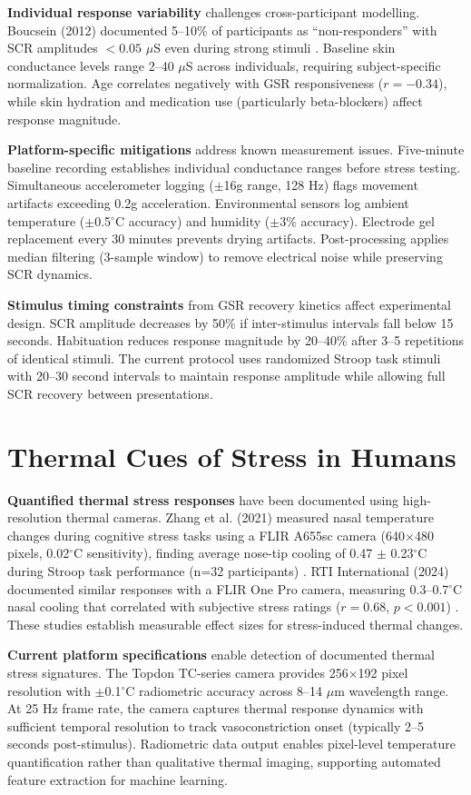 \textbf{Individual response variability} challenges cross-participant modelling. Boucsein (2012) documented 5--10\% of participants as ``non-responders'' with SCR amplitudes $<0.05$ $\mu$S even during strong stimuli \cite{ref1}. Baseline skin conductance levels range 2--40 $\mu$S across individuals, requiring subject-specific normalization. Age correlates negatively with GSR responsiveness ($r = -0.34$), while skin hydration and medication use (particularly beta-blockers) affect response magnitude.

\textbf{Platform-specific mitigations} address known measurement issues. Five-minute baseline recording establishes individual conductance ranges before stress testing. Simultaneous accelerometer logging ($\pm$16g range, 128 Hz) flags movement artifacts exceeding 0.2g acceleration. Environmental sensors log ambient temperature ($\pm$0.5$^\circ$C accuracy) and humidity ($\pm$3\% accuracy). Electrode gel replacement every 30 minutes prevents drying artifacts. Post-processing applies median filtering (3-sample window) to remove electrical noise while preserving SCR dynamics.

\textbf{Stimulus timing constraints} from GSR recovery kinetics affect experimental design. SCR amplitude decreases by 50\% if inter-stimulus intervals fall below 15 seconds. Habituation reduces response magnitude by 20--40\% after 3--5 repetitions of identical stimuli. The current protocol uses randomized Stroop task stimuli with 20--30 second intervals to maintain response amplitude while allowing full SCR recovery between presentations.

\section{Thermal Cues of Stress in Humans}
\textbf{Quantified thermal stress responses} have been documented using high-resolution thermal cameras. Zhang et al. (2021) measured nasal temperature changes during cognitive stress tasks using a FLIR A655sc camera (640$\times$480 pixels, 0.02$^\circ$C sensitivity), finding average nose-tip cooling of 0.47 $\pm$ 0.23$^\circ$C during Stroop task performance (n=32 participants) \cite{ref5}. RTI International (2024) documented similar responses with a FLIR One Pro camera, measuring 0.3--0.7$^\circ$C nasal cooling that correlated with subjective stress ratings ($r = 0.68$, $p < 0.001$) \cite{ref6}. These studies establish measurable effect sizes for stress-induced thermal changes.

\textbf{Current platform specifications} enable detection of documented thermal stress signatures. The Topdon TC-series camera provides 256$\times$192 pixel resolution with $\pm$0.1$^\circ$C radiometric accuracy across 8--14 $\mu$m wavelength range. At 25 Hz frame rate, the camera captures thermal response dynamics with sufficient temporal resolution to track vasoconstriction onset (typically 2--5 seconds post-stimulus). Radiometric data output enables pixel-level temperature quantification rather than qualitative thermal imaging, supporting automated feature extraction for machine learning.

